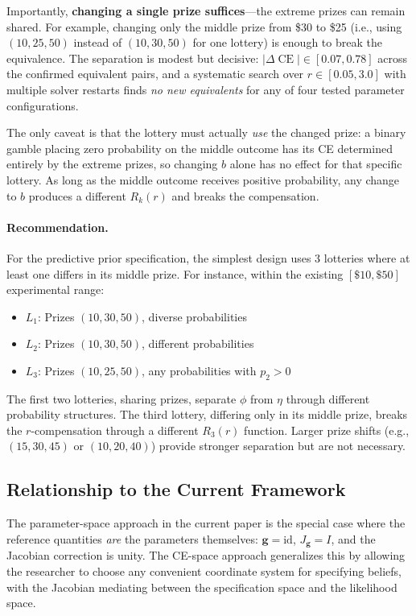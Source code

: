 \documentclass[11pt,a4paper]{article}
\theoremstyle{definition}
\DeclareMathOperator{\CE}{CE}
\begin{document}
Importantly, \textbf{changing a single prize suffices}---the extreme prizes can
remain shared. For example, changing only the middle prize from \$30 to \$25
(i.e., using $(10, 25, 50)$ instead of $(10, 30, 50)$ for one lottery) is
enough to break the equivalence. The separation is modest but decisive:
$|\Delta\CE| \in [0.07, 0.78]$ across the confirmed equivalent pairs, and a
systematic search over $r \in [0.05, 3.0]$ with multiple solver restarts finds
\emph{no new equivalents} for any of four tested parameter configurations.

The only caveat is that the lottery must actually \emph{use} the changed
prize: a binary gamble placing zero probability on the middle outcome has its
CE determined entirely by the extreme prizes, so changing $b$ alone has no
effect for that specific lottery. As long as the middle outcome receives
positive probability, any change to $b$ produces a different $R_k(r)$ and
breaks the compensation.

\paragraph{Recommendation.} For the predictive prior specification, the
simplest design uses 3 lotteries where at least one differs in its middle
prize. For instance, within the existing $[\$10, \$50]$ experimental range:
\begin{itemize}
    \item $L_1$: Prizes $(10, 30, 50)$, diverse probabilities
    \item $L_2$: Prizes $(10, 30, 50)$, different probabilities
    \item $L_3$: Prizes $(10, 25, 50)$, any probabilities with $p_2 > 0$
\end{itemize}
The first two lotteries, sharing prizes, separate $\phi$ from $\eta$ through
different probability structures. The third lottery, differing only in its
middle prize, breaks the $r$-compensation through a different $R_3(r)$
function. Larger prize shifts (e.g., $(15, 30, 45)$ or $(10, 20, 40)$)
provide stronger separation but are not necessary.

\subsection{Relationship to the Current Framework}

The parameter-space approach in the current paper is the special case where the
reference quantities \emph{are} the parameters themselves:
$\mathbf{g} = \text{id}$, $J_{\mathbf{g}} = I$, and the Jacobian correction
is unity. The CE-space approach generalizes this by allowing the researcher to
choose any convenient coordinate system for specifying beliefs, with the
Jacobian mediating between the specification space and the likelihood space.
\end{document}
